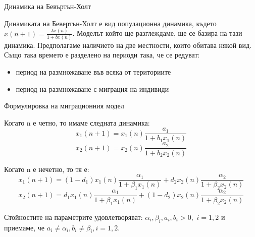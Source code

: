
\begin{frame}[t]{Динамика на Бевъртън-Холт}

  Динамиката на Бевертън-Холт е вид популационна динамика, където $x(n+1)=\frac{\lambda x(n)}{1+bx(n)}$. Моделът който ще разглеждаме, ще се базира на тази динамика. Предполагаме наличието на две местности, които обитава някой вид. Също така времето е разделено на периоди така, че се редуват:
  \begin{itemize}
    \item период на размножаване във всяка от териториите
    \item период на размножаване с миграция на индивиди
  \end{itemize}

\end{frame}

\begin{frame}[t]{Формулировка на миграционния модел}

  Когато n е четно, то имаме следната динамика:
  \[x_{1}(n+1)=x_{1}(n)\frac{a_{1}}{1+b_{1} x_{1}(n)}\]
  \[x_{2}(n+1)=x_{2}(n)\frac{a_{2}}{1+b_{2} x_{2}(n)}\]

  Когато n е нечетно, то тя е:
  \[x_{1}(n+1)=(1-d_{1})x_{1}(n)\frac{\alpha_{1}}{1+\beta_{1} x_{1}(n)} + d_{2} x_{2}(n)\frac{\alpha_{2}}{1 + \beta_{2} x_{2}(n)}\]
  \[x_{2}(n+1)=d_{1}x_{1}(n)\frac{\alpha_{1}}{1+\beta_{1} x_{1}(n)} + (1-d_{2}) x_{2}(n)\frac{\alpha_{2}}{1 + \beta_{2} x_{2}(n)}\]

  Стойностите на параметрите удовлетворяват:
  $\alpha_{i},  \beta_{i}, a_{i}, b_{i} > 0,$ $i=1,2$ и приемаме, че $a_{i} \neq \alpha_{i}, b_{i} \neq \beta_{i}, i=1,2$.
  
\end{frame}
